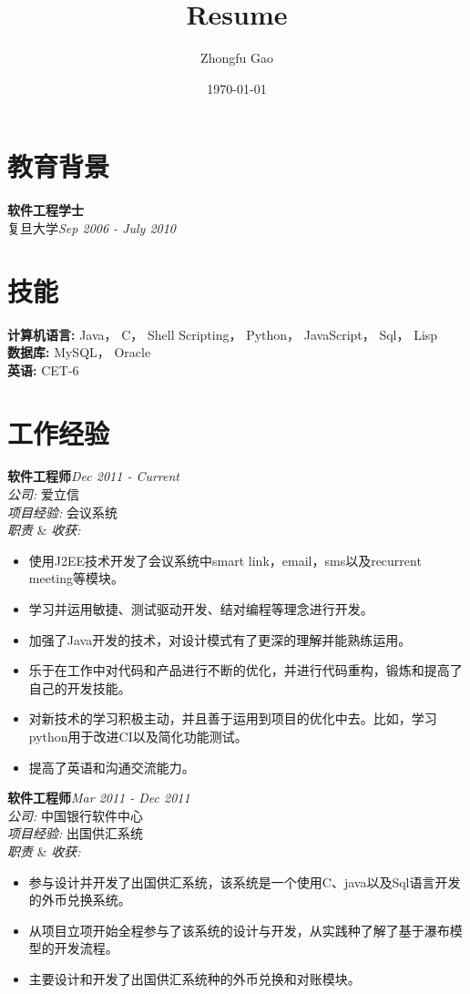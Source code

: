 \documentclass[line, margin, 12pt]{res}
\author{Zhongfu Gao}
\title{Resume}
\date{\today}
\begin{document}
\renewcommand{\namefont}{ \LARGE \bf } %
\address{{\bf 电子邮件: }joshuafufu@gmail.com}
\address{{\bf 移动电话: }(+86)15921928229}

\begin{resume}

\section{教育背景}
{\bf 软件工程学士}\\
复旦大学\hfill {\it Sep 2006 - July 2010}\\

\section{技能}
{\bf 计算机语言:} Java， C， Shell Scripting， Python， JavaScript， Sql， Lisp \\
{\bf 数据库:} MySQL， Oracle\\
{\bf 英语:} CET-6

\section{工作经验}

{\bf 软件工程师}\hfill {\it Dec 2011 - Current}\\
{\sl 公司:} 爱立信\\
{\sl 项目经验:} 会议系统\\
{\sl 职责} \& {\sl 收获:}
\begin{itemize}
\item 使用J2EE技术开发了会议系统中smart link，email，sms以及recurrent meeting等模块。
\item 学习并运用敏捷、测试驱动开发、结对编程等理念进行开发。
\item 加强了Java开发的技术，对设计模式有了更深的理解并能熟练运用。
\item 乐于在工作中对代码和产品进行不断的优化，并进行代码重构，锻炼和提高了自己的开发技能。
\item 对新技术的学习积极主动，并且善于运用到项目的优化中去。比如，学习python用于改进CI以及简化功能测试。
\item 提高了英语和沟通交流能力。
\end{itemize}

{\bf 软件工程师}\hfill {\it Mar 2011 - Dec 2011}\\
{\sl 公司:} 中国银行软件中心\\
{\sl 项目经验:} 出国供汇系统\\
{\sl 职责} \& {\sl 收获:}
\begin{itemize}
\item 参与设计并开发了出国供汇系统，该系统是一个使用C、java以及Sql语言开发的外币兑换系统。
\item 从项目立项开始全程参与了该系统的设计与开发，从实践种了解了基于瀑布模型的开发流程。
\item 主要设计和开发了出国供汇系统种的外币兑换和对账模块。
\end{itemize}


\end{resume}
\end{document}
